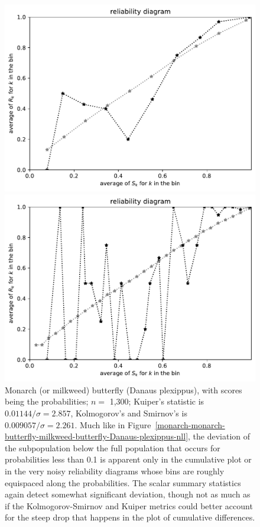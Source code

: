 \documentclass{article}
\begin{document}
\begin{figure}
\begin{centering}
\parbox{\imsize}{\includegraphics[width=\imsize]
{./codes/unweighted/prob-1-323-monarch-monarch-butterfly-milkweed-butterfly-Danaus-plexippusequiscore10}}
\quad\quad
\parbox{\imsize}{\includegraphics[width=\imsize]
{./codes/unweighted/prob-1-323-monarch-monarch-butterfly-milkweed-butterfly-Danaus-plexippusequiscore30}}

\end{centering}
\caption{Monarch (or milkweed) butterfly (Danaus plexippus),
         with scores being the probabilities;
         $n =$ 1,300; Kuiper's statistic is $0.01144 / \sigma = 2.857$,
         Kolmogorov's and Smirnov's is $0.009057 / \sigma = 2.261$.
Much like in
Figure~\ref{monarch-monarch-butterfly-milkweed-butterfly-Danaus-plexippus-nll},
the deviation of the subpopulation below the full population that occurs
for probabilities less than 0.1 is apparent only in the cumulative plot
or in the very noisy reliability diagrams whose bins
are roughly equispaced along the probabilities.
The scalar summary statistics again detect somewhat significant deviation,
though not as much as if the Kolmogorov-Smirnov and Kuiper metrics
could better account for the steep drop that happens
in the plot of cumulative differences.
}
\label{monarch-monarch-butterfly-milkweed-butterfly-Danaus-plexippus-prob}
\end{figure}
\end{document}
